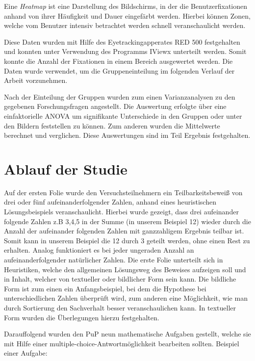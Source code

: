Eine \textit{Heatmap} ist eine Darstellung des Bildschirms, in der die Benutzerfixationen anhand von ihrer Häufigkeit und Dauer eingefärbt werden. Hierbei können Zonen, welche vom Benutzer intensiv betrachtet werden schnell veranschaulicht werden.

Diese Daten wurden mit Hilfe des Eyetrackingapperates RED 500 festgehalten und konnten unter Verwendung des Programms IViewx unterteilt werden. Somit konnte die Anzahl der Fixationen in einem Bereich ausgewertet werden. Die Daten wurde verwendet, um die Gruppeneinteilung im folgenden Verlauf der Arbeit vorzunehmen.

Nach der Einteilung der Gruppen wurden zum einen Varianzanalysen zu den gegebenen Forschungsfragen angestellt. Die Auswertung erfolgte über eine einfaktorielle ANOVA um signifikante Unterschiede in den Gruppen oder unter den Bildern feststellen zu können. Zum anderen wurden die Mittelwerte berechnet und verglichen. Diese Auswertungen sind im Teil Ergebnis festgehalten.

\section{Ablauf der Studie}

Auf der ersten Folie wurde den Versuchsteilnehmern ein Teilbarkeitsbeweiß von drei oder fünf aufeinanderfolgender Zahlen, anhand eines heuristischen Lösungsbeispiels veranschaulicht. Hierbei wurde gezeigt, dass drei aufeinander folgende Zahlen z.B 3,4,5 in der Summe (in unserem Beispiel 12) wieder durch die Anzahl der aufeinander folgenden Zahlen mit ganzzahligem Ergebnis teilbar ist. Somit kann in unserem Beispiel die 12 durch 3 geteilt werden, ohne einen Rest zu erhalten.
Analog funktioniert es bei jeder ungeraden Anzahl an aufeinanderfolgender natürlicher Zahlen. Die erste Folie unterteilt sich in Heuristiken, welche den allgemeinen Lösungsweg des Beweises aufzeigen soll und in Inhalt, welcher von textueller oder bildlicher Form sein kann. Die bildliche Form ist zum einen ein Anfangsbeispiel, bei dem die Hypothese bei unterschiedlichen Zahlen überprüft wird, zum anderen eine Möglichkeit, wie man durch Sortierung den Sachverhalt besser veranschaulichen kann. In textueller Form wurden die Überlegungen hierzu festgehalten.

Darauffolgend wurden den \gls{PuP} neun mathematische Aufgaben gestellt, welche sie mit Hilfe einer multiple-choice-Antwortmöglichkeit bearbeiten sollten. Beispiel einer Aufgabe:

